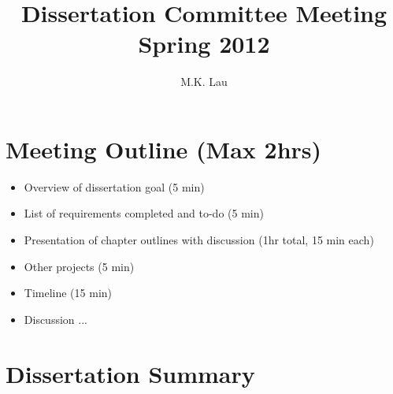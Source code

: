 \documentclass[12pt]{article}
\title{Dissertation Committee Meeting Spring 2012}
\author{M.K. Lau}
\begin{document}
\maketitle

\thispagestyle{empty}

\setcounter{tocdepth}{3}  %
\tableofcontents

\section{Meeting Outline (Max 2hrs)}
\begin{itemize}
\item Overview of dissertation goal (5 min)
\item List of requirements completed and to-do (5 min)
\item Presentation of chapter outlines with discussion (1hr total, 15 min each)
\item Other projects (5 min)
\item Timeline (15 min)
\item Discussion ...
\end{itemize}

\section{Dissertation Summary}
\end{document}
